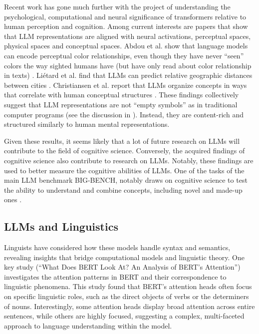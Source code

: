 Recent work has gone much further with the project of understanding the psychological, computational and neural significance of transformers relative to human perception and cognition. Among current interests are papers that show that LLM representations are aligned with neural activations,  perceptual spaces, physical spaces and conceptual spaces. Abdou et al. show that language models can encode perceptual color relationships, even though they have never ``seen'' colors the way sighted humans have (but have only read about color relationship in texts) \cite{abdou2021can}. Liétard et al. find that LLMs can predict relative geographic distances between cities \cite{lietard2021do}. Christiansen et al. report that LLMs organize concepts in ways that correlate with human conceptual structures \cite{christiansen2023large}. These findings collectively suggest that LLM representations are not ``empty symbols'' as in traditional computer programs (see the discussion in ). Instead, they are content-rich and structured similarly to human mental representations.

Given these results, it seems likely that a lot of future research on LLMs will contribute to the field of cognitive science. Conversely, the acquired findings of cognitive science also contribute to research on LLMs. Notably, these findings are used to better measure the cognitive abilities of LLMs. One of the tasks of the main LLM benchmark BIG-BENCH, notably draws on cognitive science to test the ability to understand and combine concepts, including novel and made-up ones \cite{srivastava2022beyond}.

\subsection{LLMs and Linguistics}

Linguists have considered how these models handle syntax and semantics, revealing insights that bridge computational models and linguistic theory. One key study (``What Does BERT Look At? An Analysis of BERT's Attention'') investigates the attention patterns in BERT and their correspondence to linguistic phenomena. This study found that BERT's attention heads often focus on specific linguistic roles, such as the direct objects of verbs or the determiners of nouns. Interestingly, some attention heads display broad attention across entire sentences, while others are highly focused, suggesting a complex, multi-faceted approach to language understanding within the model. 

